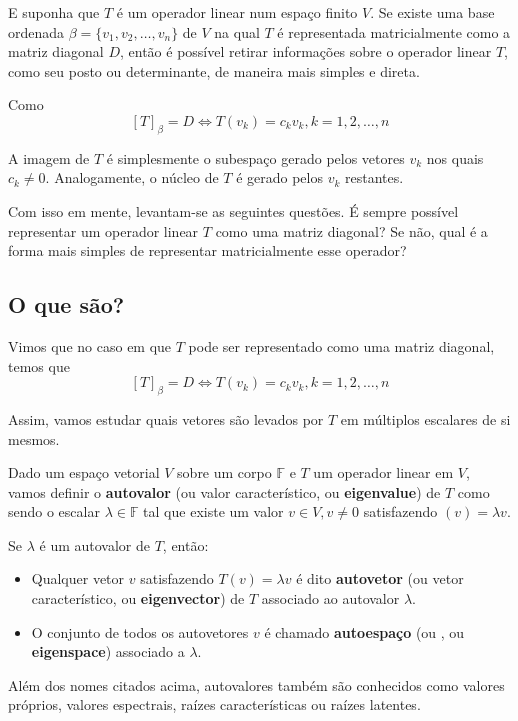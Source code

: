 \documentclass[12pt,a4paper]{article}
\begin{document}
E suponha que $T$ é um operador linear num espaço finito $V$. Se existe uma base ordenada $\beta = \{ v_1, v_2, \ldots, v_n \}$ de $V$ na qual $T$ é representada matricialmente como a matriz diagonal $D$, então é possível retirar informações sobre o operador linear $T$, como seu posto ou determinante, de maneira mais simples e direta.

Como 
\[
[T]_\beta = D \iff T(v_k) = c_k v_k, k = 1, 2, \ldots, n
\]

A imagem de $T$ é simplesmente o subespaço gerado pelos vetores $v_k$ nos quais $c_k \neq 0$. Analogamente, o núcleo de $T$ é gerado pelos $v_k$ restantes.

Com isso em mente, levantam-se as seguintes questões. É sempre possível representar um operador linear $T$ como uma matriz diagonal? Se não, qual é a forma mais simples de representar matricialmente esse operador?

\subsection{O que são?}

Vimos que no caso em que $T$ pode ser representado como uma matriz diagonal, temos que
\[
[T]_\beta = D \iff T(v_k) = c_k v_k, k = 1, 2, \ldots, n
\]

Assim, vamos estudar quais vetores são levados por $T$ em múltiplos escalares de si mesmos.

Dado um espaço vetorial $V$ sobre um corpo $\mathbb{F}$ e $T$ um operador linear em $V$, vamos definir o \textbf{autovalor} (ou valor característico, ou \textbf{eigenvalue}) de $T$ como sendo o escalar $\lambda \in \mathbb{F}$ tal que existe um valor $v \in V, v \neq 0$ satisfazendo $(v) = \lambda v$.

Se $\lambda$ é um autovalor de $T$, então: 

\begin{itemize}
\item Qualquer vetor $v$ satisfazendo $T(v) = \lambda v$ é dito \textbf{autovetor} (ou vetor característico, ou \textbf{eigenvector})  de $T$ associado ao autovalor $\lambda$.
\item O conjunto de todos os autovetores $v$ é chamado \textbf{autoespaço} (ou , ou \textbf{eigenspace}) associado a $\lambda$.
\end{itemize}

Além dos nomes citados acima, autovalores também são conhecidos como valores próprios, valores espectrais, raízes características ou raízes latentes.
\end{document}
